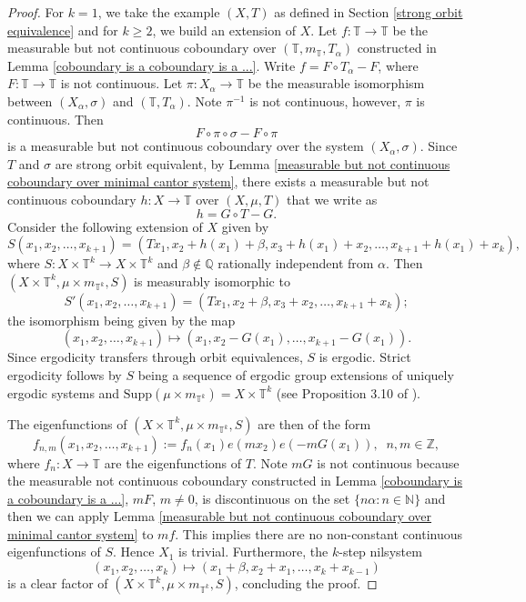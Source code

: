 \documentclass[12pt]{amsart}
\theoremstyle{definition}
\theoremstyle{plain}
\theoremstyle{definition}
\numberwithin{equation}{section}
\begin{document}
\begin{proof}
    For $k=1$, we take the example $(X,T)$ as defined in Section \ref{strong orbit equivalence} and for $k \geq 2$, we build an extension of $X$. Let $f\colon \mathbb{T}\rightarrow \mathbb{T}$ be the measurable but not continuous coboundary over $(\mathbb{T},m_{\mathbb{T}},T_{\alpha})$ constructed in Lemma \ref{coboundary is a coboundary is a ...}. Write $f=F\circ T_{\alpha}-F$, where $F\colon \mathbb{T} \rightarrow \mathbb{T}$ is not continuous. Let $\pi\colon X_{\alpha} \rightarrow \mathbb{T}$ be the measurable isomorphism between $(X_\alpha,\sigma)$ and $(\mathbb{T},T_{\alpha})$. 
Note $\pi^{-1}$ is not continuous, however, $\pi$ is continuous. Then $$F\circ \pi\circ \sigma -F\circ \pi$$ is a measurable but not continuous coboundary over the system $(X_{\alpha},\sigma)$. Since $T$ and $\sigma$ are strong orbit equivalent, by Lemma \ref{measurable but not continuous coboundary over minimal cantor system}, there exists a measurable but not continuous coboundary $h\colon X \rightarrow \mathbb{T}$ over $(X,\mu,T)$ that we write as $$h=G \circ T-G.$$ Consider the following extension of $X$ given by 
    $$S(x_1,x_2,\dots,x_{k+1})=(Tx
    _1, x_2+h(x_1)+\beta, x_3+h(x_1)+x_2,\dots,x_{k+1}+h(x_1)+x_k),$$ where $S\colon X \times \mathbb{T}^{k} \rightarrow X \times \mathbb{T}^{k}$ and $\beta \notin \mathbb{Q}$ rationally independent from $\alpha$.
     Then $(X \times \mathbb{T}^{k},\mu\times m_{\mathbb{T}^{k}},S)$ is measurably isomorphic to $$S'(x_1,x_2,\dots,x_{k+1})=(Tx_1,x_2+\beta,x_3+x_2,\dots,x_{k+1}+x_k);$$ the isomorphism being given by the map $$(x_1,x_2,\dots,x_{k+1}) \mapsto (x_1,x_2-G(x_1),\dots, x_{k+1}-G(x_1)).$$ Since ergodicity transfers through orbit equivalences, $S$ is ergodic. Strict ergodicity follows by $S$ being a sequence of ergodic group extensions of uniquely ergodic systems and $\mathrm{Supp}(\mu \times m_{\mathbb{T}^{k}})=X\times  \mathbb{T}^{k}$ (see Proposition 3.10 of \cite{Fur81}).
     
     The eigenfunctions of $(X \times \mathbb{T}^{k},\mu\times m_{\mathbb{T}^{k}},S)$ are then of the form $$f_{n,m}(x_1,x_2,\dots,x_{k+1}):=f_{n}(x_1)e(mx_2)e(-mG(x_1)), \;\;n,m \in \mathbb{Z},$$ where $f_{n}\colon X \rightarrow \mathbb{T}$ are the eigenfunctions of $T$. Note $mG$ is not continuous because the measurable not continuous coboundary constructed in Lemma \ref{coboundary is a coboundary is a ...}, $mF$, $m\neq 0$, is discontinuous on the set $\{n\alpha\colon n \in \mathbb{N}\}$ and then we can apply Lemma \ref{measurable but not continuous coboundary over minimal cantor system} to $mf$. This implies there are no non-constant continuous eigenfunctions of $S$. Hence $X_1$ is trivial. Furthermore, the $k$-step nilsystem $$(x_1,x_2,\dots,x_k)\mapsto(x_1+\beta,x_2+x_1,\dots,x_k+x_{k-1})$$ is a clear factor of $(X \times \mathbb{T}^{k},\mu\times m_{\mathbb{T}^{k}},S)$, concluding the proof. \end{proof}
\end{document}
